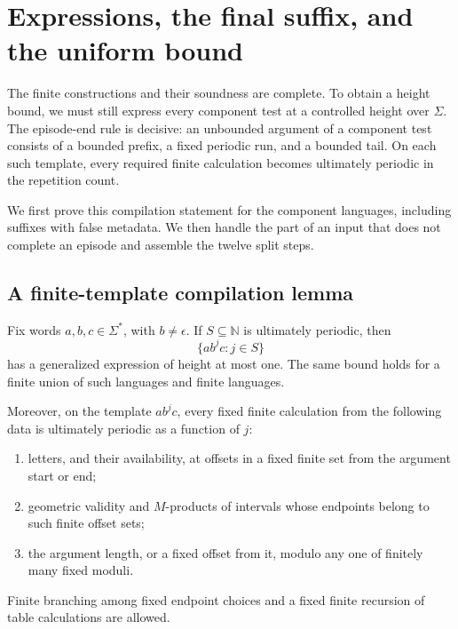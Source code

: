 \section{Expressions, the final suffix, and the uniform bound}\label{sec:compilation}

The finite constructions and their soundness are complete. To obtain a
height bound, we must still express every component test at a controlled
height over \(\Sigma\). The episode-end rule is decisive: an unbounded
argument of a component test consists of a bounded prefix, a fixed periodic
run, and a bounded tail. On each such template, every required finite
calculation becomes ultimately periodic in the repetition count.

We first prove this compilation statement for the component languages,
including suffixes with false metadata. We then handle the part of an input
that does not complete an episode and assemble the twelve split steps.

\subsection{A finite-template compilation lemma}

\begin{lemma}\label{lem:template}
Fix words \(a,b,c\in\Sigma^*\), with \(b\ne\epsilon\).
If \(S\subseteq\mathbb N\) is ultimately periodic, then
\[
                        \{ab^jc:j\in S\}
\]
has a generalized expression of height at most one. The same bound holds for
a finite union of such languages and finite languages.

Moreover, on the template \(ab^jc\), every fixed finite calculation from the
following data is ultimately periodic as a function of \(j\):
\begin{enumerate}[label=\textup{(\roman*)}]
\item letters, and their availability, at offsets in a fixed finite set from
the argument start or end;
\item geometric validity and \(M\)-products of intervals whose endpoints
belong to such finite offset sets;
\item the argument length, or a fixed offset from it, modulo any one of
finitely many fixed moduli.
\end{enumerate}
Finite branching among fixed endpoint choices and a fixed finite recursion
of table calculations are allowed.
\end{lemma}

